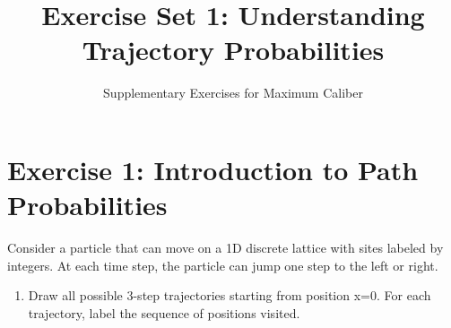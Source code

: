 \documentclass{article}
\title{Exercise Set 1: Understanding Trajectory Probabilities}
\author{Supplementary Exercises for Maximum Caliber}
\date{}
\newenvironment{answer}
    {\begin{mdframed}[linewidth=0.5pt,backgroundcolor=gray!5]
    \vspace{0.5em}}
    {\vspace{0.5em}\end{mdframed}}
\newenvironment{solutionfigure}
    {\begin{figure}[H]
    \centering
    \setlength{\abovecaptionskip}{6pt}
    \setlength{\belowcaptionskip}{6pt}}
    {\end{figure}}
\begin{document}
\maketitle

\section*{Exercise 1: Introduction to Path Probabilities}

Consider a particle that can move on a 1D discrete lattice with sites labeled by integers. At each time step, the particle can jump one step to the left or right.


\begin{enumerate}
    \item[(a)] Draw all possible 3-step trajectories starting from position x=0. For each trajectory, label the sequence of positions visited.

    \begin{answer}
    \begin{solutionfigure}
\end{solutionfigure}
\end{answer}
\end{enumerate}
\end{document}
